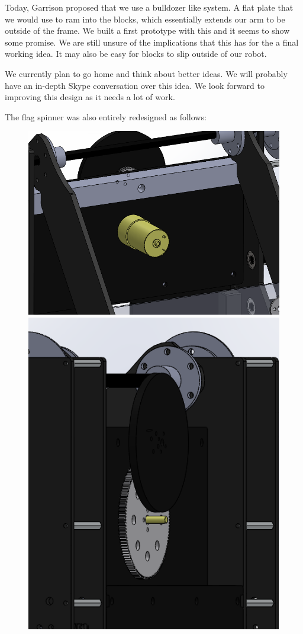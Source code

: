 Today, Garrison proposed that we use a bulldozer like system. A flat plate that we would use to ram into the blocks, which essentially extends our arm to be outside of the frame. We built a first prototype with this and it seems to show some promise. We are still unsure of the implications that this has for the a final working idea. It may also be easy for blocks to slip outside of our robot. 

We currently plan to go home and think about better ideas. We will probably have an in-depth Skype conversation over this idea. We look forward to improving this design as it needs a lot of work. 

The flag spinner was also entirely redesigned as follows:

\begin{figure}[H]
\begin{center}
\includegraphics[scale=0.4]{images/FlagSpinnerV2Back.png}
\includegraphics[scale=0.5]{images/FlagSpinnerV2Front.png}

\end{center}
\end{figure}
